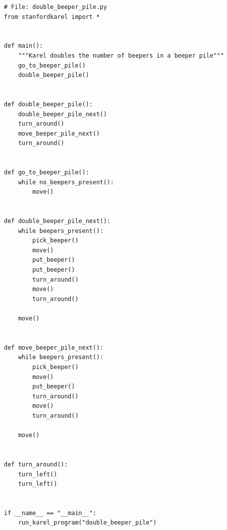 \begin{verbatim}
# File: double_beeper_pile.py
from stanfordkarel import *


def main():
    """Karel doubles the number of beepers in a beeper pile"""
    go_to_beeper_pile()
    double_beeper_pile()


def double_beeper_pile():
    double_beeper_pile_next()
    turn_around()
    move_beeper_pile_next()
    turn_around()


def go_to_beeper_pile():
    while no_beepers_present():
        move()


def double_beeper_pile_next():
    while beepers_present():
        pick_beeper()
        move()
        put_beeper()
        put_beeper()
        turn_around()
        move()
        turn_around()

    move()


def move_beeper_pile_next():
    while beepers_present():
        pick_beeper()
        move()
        put_beeper()
        turn_around()
        move()
        turn_around()

    move()


def turn_around():
    turn_left()
    turn_left()


if __name__ == "__main__":
    run_karel_program("double_beeper_pile")
\end{verbatim}
%
\clearpage
